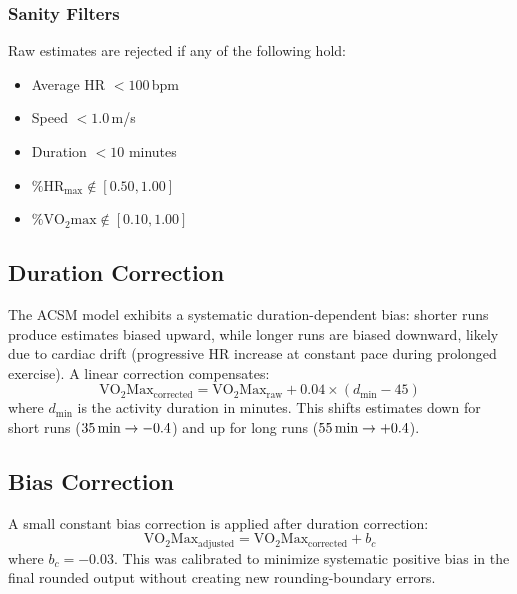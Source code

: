 \documentclass[11pt,a4paper]{article}
\begin{document}
\subsubsection{Sanity Filters}

Raw estimates are rejected if any of the following hold:
\begin{itemize}[nosep]
    \item Average HR $< 100$\,bpm
    \item Speed $< 1.0$\,m/s
    \item Duration $< 10$ minutes
    \item $\%\text{HR}_{\text{max}} \notin [0.50, 1.00]$
    \item $\%\text{VO}_2\text{max} \notin [0.10, 1.00]$
\end{itemize}


\subsection{Duration Correction}
\label{sec:duration-correction}

The ACSM model exhibits a systematic duration-dependent bias: shorter runs produce estimates biased upward, while longer runs are biased downward, likely due to cardiac drift (progressive HR increase at constant pace during prolonged exercise).
A linear correction compensates:
\begin{equation}
\text{VO}_2\text{Max}_{\text{corrected}} = \text{VO}_2\text{Max}_{\text{raw}} + 0.04 \times (d_{\text{min}} - 45)
\label{eq:dur-correction}
\end{equation}
where $d_{\text{min}}$ is the activity duration in minutes.
This shifts estimates down for short runs ($35\text{\,min} \to -0.4$) and up for long runs ($55\text{\,min} \to +0.4$).


\subsection{Bias Correction}
\label{sec:bias-correction}

A small constant bias correction is applied after duration correction:
\begin{equation}
\text{VO}_2\text{Max}_{\text{adjusted}} = \text{VO}_2\text{Max}_{\text{corrected}} + b_c
\label{eq:bias-correction}
\end{equation}
where $b_c = -0.03$.
This was calibrated to minimize systematic positive bias in the final rounded output without creating new rounding-boundary errors.
\end{document}
